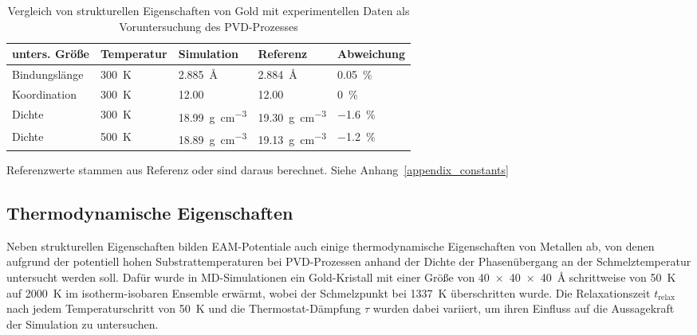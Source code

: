 \begin{table}[hbt]
  \begin{threeparttable}
  \oddrowcolors
  \caption[Vergleich von strukturellen Eigenschaften von Gold]{
    Vergleich von strukturellen Eigenschaften von Gold mit experimentellen Daten als Voruntersuchung des PVD-Prozesses
  }
  \label{tab:goldpreresults}
  \begin{tabularx}{\textwidth}{|lXXXX|}
    \hline
    \textbf{unters. Größe} & \textbf{Temperatur} & \textbf{Simulation}                     & \textbf{Referenz}\tnote{a}              & \textbf{Abweichung} \\
    \hline
    Bindungslänge          & \SI{300}{\kelvin}   & \SI{2.885}{\angstrom}                   & \SI{2.884}{\angstrom}                   & \SI{0.05}{\percent} \\
    Koordination           & \SI{300}{\kelvin}   & \SI{12.00}{}                            & \SI{12.00}{}                            & \SI{0}{\percent}    \\
    Dichte                 & \SI{300}{\kelvin}   & \SI{18.99}{\gram\per\cubic\centi\meter} & \SI{19.30}{\gram\per\cubic\centi\meter} & \SI{-1.6}{\percent} \\
    Dichte                 & \SI{500}{\kelvin}   & \SI{18.89}{\gram\per\cubic\centi\meter} & \SI{19.13}{\gram\per\cubic\centi\meter} & \SI{-1.2}{\percent} \\
    \hline
  \end{tabularx}
  \begin{tablenotes}
    \item[a] Referenzwerte stammen aus Referenz\cite{haynes_crc_2011} oder sind daraus berechnet. Siehe Anhang~\ref{appendix_constants}
  \end{tablenotes}
  \end{threeparttable}
\end{table}

\subsection{Thermodynamische Eigenschaften}
\label{goldthermo}

Neben strukturellen Eigenschaften bilden EAM-Potentiale auch einige thermodynamische Eigenschaften von Metallen ab, von denen aufgrund der potentiell hohen Substrattemperaturen bei PVD-Prozessen\cite{gottsche_uber_1956} anhand der Dichte der Phasenübergang an der Schmelztemperatur untersucht werden soll.
Dafür wurde in MD-Simulationen ein Gold-Kristall mit einer Größe von \SI{40x40x40}{\angstrom} schrittweise von \SI{50}{\kelvin} auf \SI{2000}{\kelvin} im isotherm-isobaren Ensemble erwärmt, wobei der Schmelzpunkt bei \SI{1337}{\kelvin}\cite{haynes_crc_2011} überschritten wurde.
Die Relaxationszeit $t_\text{relax}$ nach jedem Temperaturschritt von \SI{50}{\kelvin} und die Thermostat-Dämpfung $\tau$ wurden dabei variiert, um ihren Einfluss auf die Aussagekraft der Simulation zu untersuchen.

